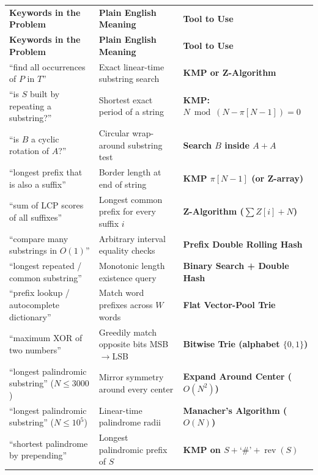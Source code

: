 \documentclass[11pt,a4paper]{article}
\theoremstyle{definition}
\begin{document}
\begingroup\small{}
\begin{xltabular}{\textwidth}{>{\raggedright\arraybackslash}p{4.5cm} >{\raggedright\arraybackslash}X >{\raggedright\arraybackslash\bfseries}p{4.0cm}}
\toprule[1.2pt]
\textcolor{primaryblue}{\textbf{Keywords in the Problem}} & \textcolor{primaryblue}{\textbf{Plain English Meaning}} & \textcolor{primaryblue}{\textbf{Tool to Use}} \\
\midrule[0.6pt]
\endfirsthead
{}\toprule[1.2pt]
\textcolor{primaryblue}{\textbf{Keywords in the Problem}} & \textcolor{primaryblue}{\textbf{Plain English Meaning}} & \textcolor{primaryblue}{\textbf{Tool to Use}} \\
\midrule[0.6pt]
\endhead
{}\bottomrule[1.2pt]
\endfoot
``find all occurrences of $P$ in $T$'' & Exact linear-time substring search & KMP or Z-Algorithm \\
``is $S$ built by repeating a substring?'' & Shortest exact period of a string & KMP: $N \bmod (N - \pi[N-1]) = 0$ \\
``is $B$ a cyclic rotation of $A$?'' & Circular wrap-around substring test & Search $B$ inside $A + A$ \\
``longest prefix that is also a suffix'' & Border length at end of string & KMP $\pi[N-1]$ (or Z-array) \\
``sum of LCP scores of all suffixes'' & Longest common prefix for every suffix $i$ & Z-Algorithm ($\sum Z[i] + N$) \\
``compare many substrings in $O(1)$'' & Arbitrary interval equality checks & Prefix Double Rolling Hash \\
``longest repeated / common substring'' & Monotonic length existence query & Binary Search + Double Hash \\
``prefix lookup / autocomplete dictionary'' & Match word prefixes across $W$ words & Flat Vector-Pool Trie \\
``maximum XOR of two numbers'' & Greedily match opposite bits MSB$\to$LSB & Bitwise Trie (alphabet $\{0,1\}$) \\
``longest palindromic substring'' ($N \le 3000$) & Mirror symmetry around every center & Expand Around Center ($O(N^2)$) \\
``longest palindromic substring'' ($N \le 10^5$) & Linear-time palindrome radii & Manacher's Algorithm ($O(N)$) \\
``shortest palindrome by prepending'' & Longest palindromic prefix of $S$ & KMP on $S + \text{`\#'} + \operatorname{rev}(S)$ \\
\end{xltabular}\endgroup
\end{document}
